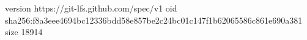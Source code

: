 version https://git-lfs.github.com/spec/v1
oid sha256:f8a3eee4694bc12336bdd58e857be2c24bc01c147f1b62065586c861e690a381
size 18914
